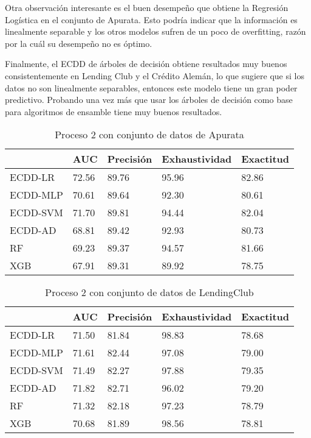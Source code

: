 Otra observación interesante es el buen desempeño que obtiene la Regresión Logística en el conjunto de Apurata. Esto podría indicar que la información es linealmente separable y los otros modelos sufren de un poco de overfitting, razón por la cuál su desempeño no es óptimo.

Finalmente, el \ac{ECDD} de árboles de decisión obtiene resultados muy buenos consistentemente en Lending Club y el Crédito Alemán, lo que sugiere que si los datos no son linealmente separables, entonces este modelo tiene un gran poder predictivo. Probando una vez más que usar los árboles de decisión como base para algoritmos de ensamble tiene muy buenos resultados.

\begin{table}[]
\centering
\caption{Proceso 2 con conjunto de datos de Apurata}
\label{tab:apurata-proc2}
\begin{tabularx}{0.75\textwidth}{|l|Y Y Y Y|}
				\hline
				& AUC		& Precisión	& Exhaustividad	& Exactitud	\\
				\hline
ECDD-LR			& 72.56		& 89.76		& 95.96			& 82.86		\\
ECDD-MLP	 	& 70.61		& 89.64		& 92.30			& 80.61		\\
ECDD-SVM	 	& 71.70		& 89.81		& 94.44			& 82.04		\\
ECDD-AD			& 68.81		& 89.42		& 92.93			& 80.73		\\
				\hline
RF		 		& 69.23		& 89.37		& 94.57			& 81.66		\\
XGB				& 67.91		& 89.31		& 89.92			& 78.75		\\
				\hline
\end{tabularx}
\end{table}


\begin{table}[]
\centering
\caption{Proceso 2 con conjunto de datos de LendingClub}
\label{tab:lc-proc2}
\begin{tabularx}{0.75\textwidth}{|l|Y Y Y Y|}
				\hline
				& AUC		& Precisión	& Exhaustividad	& Exactitud	\\
				\hline
ECDD-LR			& 71.50		& 81.84		& 98.83			& 78.68		\\
ECDD-MLP		& 71.61		& 82.44		& 97.08			& 79.00		\\
ECDD-SVM		& 71.49		& 82.27		& 97.88			& 79.35		\\
ECDD-AD			& 71.82		& 82.71		& 96.02			& 79.20		\\
				\hline
RF				& 71.32		& 82.18		& 97.23			& 78.79		\\
XGB				& 70.68		& 81.89		& 98.56			& 78.81		\\
				\hline
\end{tabularx}
\end{table}


